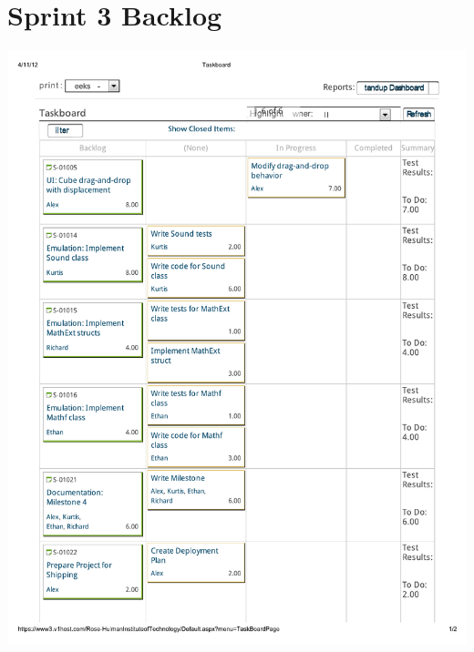 \documentclass[12pt]{article}
\begin{document}


\section*{Sprint 3 Backlog}
\includegraphics[scale=.85]{pdfs/MS3VersionOne/NewSprintDetail.pdf}

\clearpage

        
\end{document}
